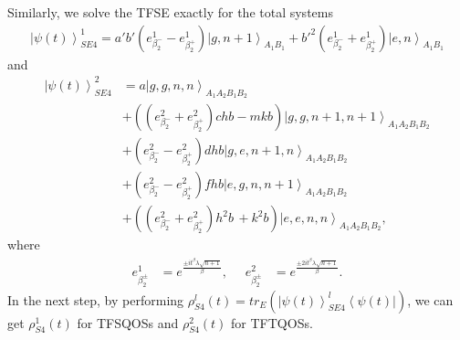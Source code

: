 \documentclass[
showpacs,  %
showkeys,  %
aps,       %
amsthm,    %
amsmath,   %
amsfonts,  %
amssymb    %
]{revtex4-1}          %
\begin{document}
Similarly, we solve the TFSE exactly for the total systems
\begin{equation}
\label{e32}
\begin{aligned}
{\left|{\psi(t)} \right\rangle_{SE4}^{1}}=a'b'({e_{\beta_2^ - }^1}-{e_{\beta_2^ + }^1}){\left| {g,n + 1} \right\rangle_{{A_1}{B_1}}}+{{b'}^2}({e_{\beta_2^ - }^1}+{e_{\beta_2^ + }^1}){\left|{e,n} \right\rangle_{{A_1}{B_1}}}
\end{aligned}
\end{equation}
and
\begin{equation}
\label{e33}
\begin{aligned}
{\left|{\psi(t)} \right\rangle_{SE4}^{2}} &= a{\left| {g,g,n,n} \right\rangle_{{A_1}{A_2}{B_1}{B_2}}}\\
&+(({e_{\beta_2^ - }^2}+{e_{\beta_2^ + }^2})chb - mkb){\left| {g,g,n + 1,n + 1} \right\rangle _{{A_1}{A_2}{B_1}{B_2}}}\\
&+ ({e_{\beta_2^ - }^2}-{e_{\beta_2^ + }^2})dhb{\left| {g,e,n + 1,n} \right\rangle _{{A_1}{A_2}{B_1}{B_2}}}\\
&+ ({e_{\beta_2^ - }^2}-{e_{\beta_2^ + }^2})fhb{\left| {e,g,n,n + 1} \right\rangle _{{A_1}{A_2}{B_1}{B_2}}}\,\\
&+ (({e_{\beta_2^ - }^2}+{e_{\beta_2^ + }^2}){h^2}b\, + {k^2}b){\left| {e,e,n,n} \right\rangle _{{A_1}{A_2}{B_1}{B_2}}},
\end{aligned}
\end{equation}
where
\begin{equation}
\label{e34}
\begin{aligned}
e_{\beta_2^\pm}^1 &= {e^{\frac{{\pm i{{t}^\beta}\lambda \sqrt {n + 1} }}{\beta}}},\,\,\,\,\,\,\,\,
e_{\beta_2^\pm}^2 &= {e^{\frac{{\pm2i{{t}^\beta}\lambda \sqrt {n + 1} }}{\beta}}}.
\end{aligned}
\end{equation}
In the next step, by performing ${\rho_{S4}^{l}(t)} = t{r_E}({\left| {\psi (t)} \right\rangle _{SE4}^{l}}\left\langle {\psi (t)} \right|)$, we can get ${\rho_{S4}^{1}(t)}$ for TFSQOSs and ${\rho_{S4}^{2}(t)}$ for TFTQOSs.
\end{document}
